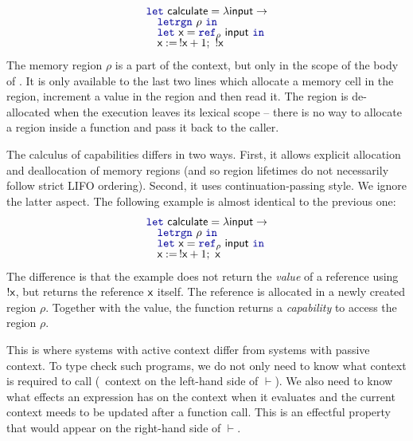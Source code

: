 \begin{equation*}
\begin{array}{l}
\kvd{let}~\ident{calculate} = \lambda \ident{input} \rightarrow\\[-0.25em]
\quad \kvd{letrgn}~\rho~\kvd{in}\\[-0.25em]
\quad \kvd{let}~\ident{x} = \kvd{ref}_\rho ~\ident{input}~\kvd{in}\\[-0.25em]
\quad \ident{x} :=\, !\ident{x} + 1;~ !\ident{x}
\end{array}
\end{equation*}
%
The memory region $\rho$ is a part of the context, but only in the scope of the body of
. It is only available to the last two lines which allocate a memory cell in the region,
increment a value in the region and then read it. The region is de-allocated when the execution
leaves its lexical scope -- there is no way to allocate a region inside a function and pass it back
to the caller.

The calculus of capabilities differs in two ways. First, it allows explicit allocation and deallocation
of memory regions (and so region lifetimes do not necessarily follow strict LIFO ordering). Second,
it uses continuation-passing style. We ignore the latter aspect. The following example is almost
identical to the previous one:
%
\begin{equation*}
\begin{array}{l}
\kvd{let}~\ident{calculate} = \lambda \ident{input} \rightarrow\\[-0.25em]
\quad \kvd{letrgn}~\rho~\kvd{in}\\[-0.25em]
\quad \kvd{let}~\ident{x} = \kvd{ref}_\rho ~\ident{input}~\kvd{in}\\[-0.25em]
\quad \ident{x} :=\, !\ident{x} + 1;~ \ident{x}
\end{array}
\end{equation*}
%
The difference is that the example does not return the \emph{value} of a reference using
$!\textnormal{\sffamily x}$, but returns the reference $\textnormal{\sffamily x}$ itself. The reference is allocated in a newly
created region $\rho$. Together with the value, the function returns a \emph{capability} to access
the region $\rho$.

This is where systems with active context differ from systems with passive context. To type check
such programs, we do not only need to know what context is required to call 
(\ie~context on the left-hand side of $\vdash$). We also need to know what effects an expression
has on the context when it evaluates and the current context meeds to be updated after a function
call. This is an effectful property that would appear on the right-hand side of $\vdash$.

